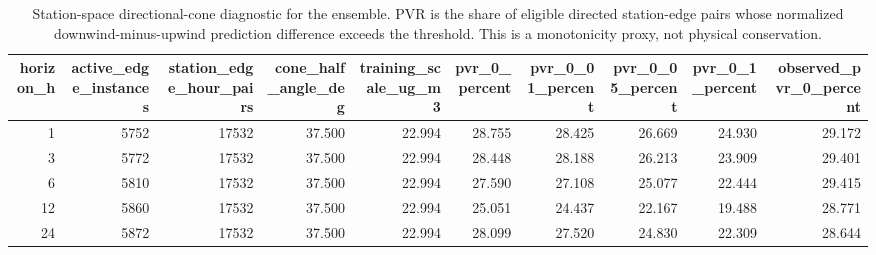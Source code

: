 \begin{table}[t]
\centering
\scriptsize
\caption{Station-space directional-cone diagnostic for the ensemble. PVR is the share of eligible directed station-edge pairs whose normalized downwind-minus-upwind prediction difference exceeds the threshold. This is a monotonicity proxy, not physical conservation.}
\label{tab:t03b_station_space_directional_diagnostic}
\begin{tabular}{rrrrrrrrrr}
\hline
horizon_h & active_edge_instances & station_edge_hour_pairs & cone_half_angle_deg & training_scale_ug_m3 & pvr_0_percent & pvr_0_01_percent & pvr_0_05_percent & pvr_0_1_percent & observed_pvr_0_percent \\
\hline
1 & 5752 & 17532 & 37.500 & 22.994 & 28.755 & 28.425 & 26.669 & 24.930 & 29.172 \\
3 & 5772 & 17532 & 37.500 & 22.994 & 28.448 & 28.188 & 26.213 & 23.909 & 29.401 \\
6 & 5810 & 17532 & 37.500 & 22.994 & 27.590 & 27.108 & 25.077 & 22.444 & 29.415 \\
12 & 5860 & 17532 & 37.500 & 22.994 & 25.051 & 24.437 & 22.167 & 19.488 & 28.771 \\
24 & 5872 & 17532 & 37.500 & 22.994 & 28.099 & 27.520 & 24.830 & 22.309 & 28.644 \\
\hline
\end{tabular}
\end{table}
